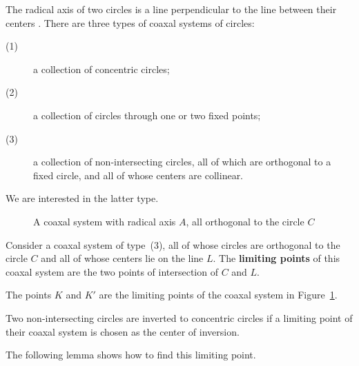 \begin{rmk}
\label{rmk:coa}
The radical axis of two circles is a line perpendicular to the line 
between their centers \cite{J29}. %
There are three types of coaxal systems of circles:
\begin{description}
\item[(1)]
	a collection of concentric circles;
\item[(2)]
	a collection of circles through one or two fixed points;
\item[(3)]
	a collection of non-intersecting circles, all of which are orthogonal
	to a fixed circle, and all of whose centers are collinear.
\end{description}
We are interested in the latter type.
\end{rmk}



\begin{figure}
\vspace{1.75in}
\caption{A coaxal system with radical axis $A$, all orthogonal to the 
		circle $C$}
\label{fig:rad}
\end{figure}


\begin{defn2}
Consider a coaxal system of type~(3),
all of whose circles are orthogonal to the circle $C$ and
all of whose centers lie on the line $L$.
The {\bf limiting points} of this coaxal system are the two points of 
intersection of $C$ and $L$.
\end{defn2}

The points $K$ and $K'$ are the limiting points of the coaxal system
in Figure~\ref{fig:rad}.

\begin{lemma}
\cite{J29} %
\label{lem:cntr}
Two non-intersecting circles are inverted to concentric circles
if a limiting point of their coaxal system is chosen as
the center of inversion.
\end{lemma}

The following lemma shows how to find this limiting point.


